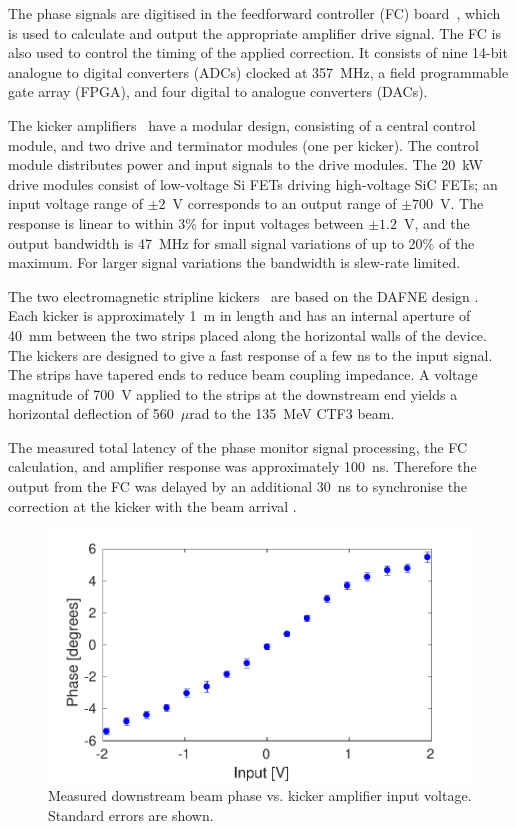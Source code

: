 \documentclass[%
 reprint,
 superscriptaddress,
 amsmath,
 amssymb,
 prl,
]{revtex4-1}
\begin{document}
The phase signals are digitised  in the feedforward controller (FC) 
board~\cite{RobertsThesis}, which is used to calculate and output the 
appropriate amplifier drive signal. The FC is also used to  control the timing 
of the applied correction. It consists of nine 14-bit analogue to digital 
converters (ADCs) clocked at 357~MHz, a field programmable gate array (FPGA), 
and four digital to analogue converters 
(DACs). 

The kicker amplifiers~\cite{RobertsThesis} have a modular design, 
consisting of a central control module, and two drive and terminator modules 
(one per kicker). The control module distributes power and input signals to the 
drive modules. The 20~kW drive modules consist of low-voltage Si FETs driving 
high-voltage SiC FETs; an input voltage range of \(\pm2\)~V corresponds to an 
output range of \(\pm700\)~V. The response is linear to within 3\% for input 
voltages between \(\pm1.2\)~V, and the output bandwidth is 47~MHz for small 
signal variations of up to 20\% of the maximum. For larger signal variations 
the bandwidth is slew-rate limited.

The two electromagnetic stripline kickers~\cite{kickerIPAC11} are based on the 
DAFNE design \cite{dafnePAC09}. Each kicker is approximately 1~m in length and 
has an internal aperture of 40~mm between the two strips placed along the 
horizontal walls of the device. The kickers are designed to give a fast 
response of a few ns to the input signal. The strips have tapered ends to 
reduce beam coupling impedance. A voltage magnitude of 700~V applied to the 
strips at the downstream end yields a horizontal deflection of 
560~$\mu$rad to the 135~MeV CTF3 beam.

The measured total latency of the phase monitor signal processing, the FC 
calculation, and amplifier response was approximately 100~ns. Therefore the 
output from the FC was delayed by an additional 30~ns to synchronise the 
correction at the kicker with the beam arrival \cite{RobertsThesis}.

\begin{figure}
	\includegraphics[width=\columnwidth]{figs/corrRange}
	\caption{\label{fig:corrRange}Measured downstream beam phase vs. kicker 
	amplifier input voltage. Standard errors are shown.}
\end{figure}
\end{document}
